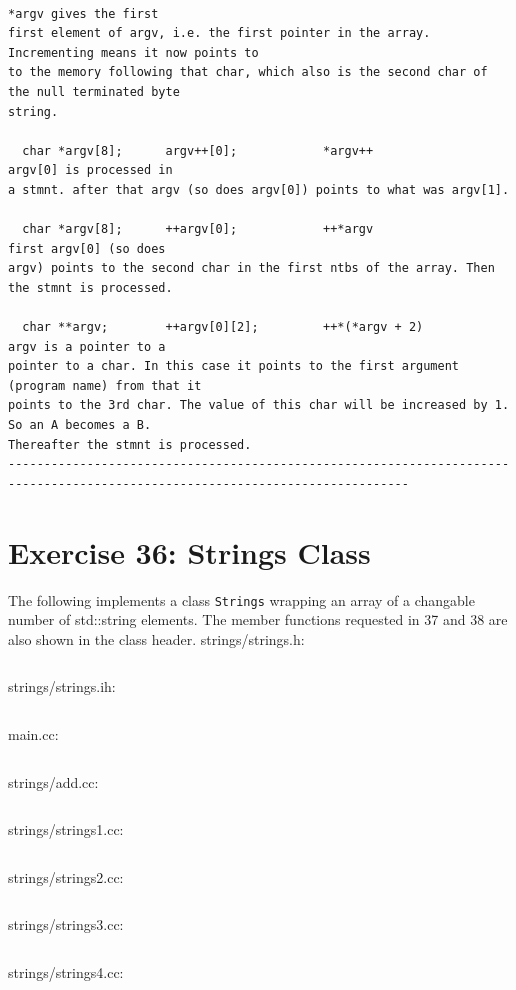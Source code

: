 \documentclass{article}[9pt]
\begin{document}
\begin{verbatim}
                                                                        *argv gives the first
first element of argv, i.e. the first pointer in the array. Incrementing means it now points to
to the memory following that char, which also is the second char of the null terminated byte
string.

  char *argv[8];      argv++[0];            *argv++                     argv[0] is processed in
a stmnt. after that argv (so does argv[0]) points to what was argv[1].

  char *argv[8];      ++argv[0];            ++*argv                     first argv[0] (so does
argv) points to the second char in the first ntbs of the array. Then the stmnt is processed.

  char **argv;        ++argv[0][2];         ++*(*argv + 2)              argv is a pointer to a
pointer to a char. In this case it points to the first argument (program name) from that it
points to the 3rd char. The value of this char will be increased by 1. So an A becomes a B.
Thereafter the stmnt is processed.
------------------------------------------------------------------------------------------------------------------------------
\end{verbatim}
\section*{Exercise 36: Strings Class}
The following implements a class \texttt{Strings} wrapping an array of a changable number of std::string elements.
The member functions requested in 37 and 38 are also shown in the class header.
strings/strings.h:
\inputminted[linenos=true, tabsize=4, frame=lines]{text}{../363738/strings/strings.h}
strings/strings.ih:
\inputminted[linenos=true, tabsize=4, frame=lines]{text}{../363738/strings/strings.ih}
main.cc:
\inputminted[linenos=true, tabsize=4, frame=lines]{text}{../363738/main_36.cc}
strings/add.cc:
\inputminted[linenos=true, tabsize=4, frame=lines]{text}{../363738/strings/add.cc}

strings/strings1.cc:
\inputminted[linenos=true, tabsize=4, frame=lines]{text}{../363738/strings/strings1.cc}
strings/strings2.cc:
\inputminted[linenos=true, tabsize=4, frame=lines]{text}{../363738/strings/strings2.cc}
strings/strings3.cc:
\inputminted[linenos=true, tabsize=4, frame=lines]{text}{../363738/strings/strings3.cc}
strings/strings4.cc:
\inputminted[linenos=true, tabsize=4, frame=lines]{text}{../363738/strings/strings4.cc}
\end{document}

